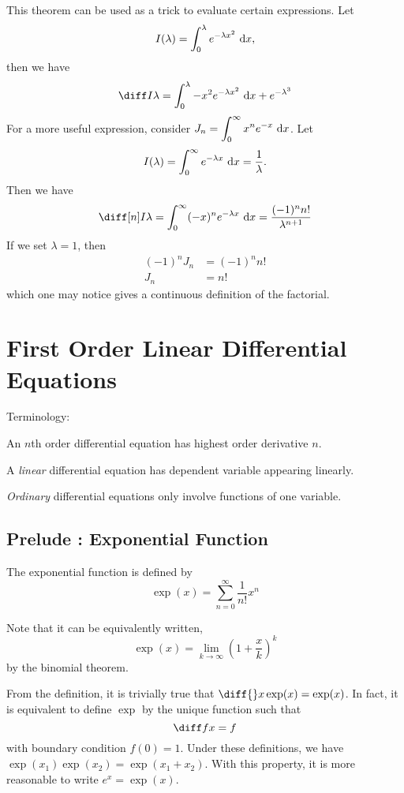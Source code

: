 \documentclass[12pt]{article}
\begin{document}
This theorem can be used as a trick to evaluate certain expressions. Let
\[
I(\lambda ) = \int_{0}^{\lambda }e^{-\lambda x^{2}}\ \mathrm{d} x,
\]
then we have
\[
\diff I\lambda = \int_{0}^{\lambda }-x^{2}e^{-\lambda x^{2}}\di x + e^{-\lambda ^{3}}
\]
For a more useful expression, consider $J_n = \displaystyle\int_{0}^{\infty}x^{n}e^{-x}\ \mathrm{d} x$.
Let
\[
I(\lambda ) = \int_{0}^{\infty}e^{-\lambda x}\ \mathrm{d} x = \frac{1}{\lambda }.
\]
Then we have
\[
    \diff[n]I\lambda = \int_{0}^{\infty} (-x)^{n}e^{-\lambda x}\di x 
    = \frac{(-1)^{n} n!}{\lambda ^{n+1}}
\]
If we set $\lambda =1$, then
\begin{align*}
    (-1)^{n}J_n &= (-1)^{n} n!\\
    J_n &= n!
\end{align*}
which one may notice gives a continuous definition of the factorial.

\section{First Order Linear Differential Equations}

Terminology:
\begin{compactenum}[(i)]
\item An $n$th order differential equation has highest order derivative $n$.
\item A \emph{linear} differential equation has dependent variable appearing linearly.
\item \emph{Ordinary} differential equations only involve functions of one variable.
\end{compactenum}

\subsection{Prelude : Exponential Function}

\begin{definition}
    The exponential function is defined by
    \[
    \exp(x) = \sum_{n=0}^{\infty} \frac{1}{n!}x^{n}
    \]
\end{definition}
Note that it can be equivalently written,
\[
\exp(x) = \lim_{k\to\infty}\left(1+\frac{x}{k}\right)^{k}
\]
by the binomial theorem.

From the definition, it is trivially true that $\diff {}x \exp(x) = \exp(x)$.
In fact, it is equivalent to define $\exp$ by the unique function such that
\[
\diff fx = f
\]
with boundary condition $f(0) = 1$.
Under these definitions, we have $\exp(x_{1})\exp(x_{2}) = \exp(x_{1}+x_{2})$.
With this property, it is more reasonable to write $e^{x} = \exp(x)$.
\end{document}
